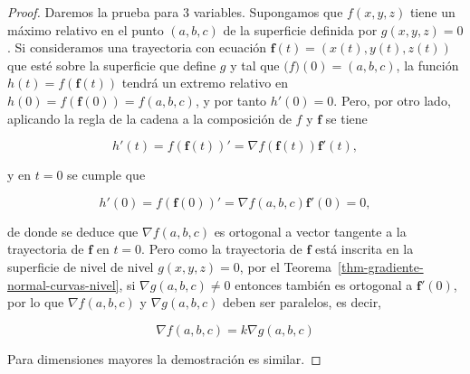 \documentclass[
  a4paper,
]{scrreport}
\theoremstyle{definition}
\theoremstyle{plain}
\theoremstyle{plain}
\theoremstyle{definition}
\theoremstyle{definition}
\theoremstyle{plain}
\theoremstyle{remark}
\begin{document}
\begin{tcolorbox}[enhanced jigsaw, breakable, title=\textcolor{quarto-callout-note-color}{\faInfo}\hspace{0.5em}{Demostración}, toprule=.15mm, coltitle=black, arc=.35mm, rightrule=.15mm, colframe=quarto-callout-note-color-frame, colbacktitle=quarto-callout-note-color!10!white, toptitle=1mm, titlerule=0mm, leftrule=.75mm, opacityback=0, colback=white, bottomrule=.15mm, bottomtitle=1mm, left=2mm, opacitybacktitle=0.6]

\begin{proof}

Daremos la prueba para 3 variables. Supongamos que \(f(x,y,z)\) tiene un
máximo relativo en el punto \((a,b,c)\) de la superficie definida por
\(g(x,y,z)=0\). Si consideramos una trayectoria con ecuación
\(\mathbf{f}(t)=(x(t),y(t),z(t))\) que esté sobre la superficie que
define \(g\) y tal que \(\mathbf(f)(0)=(a,b,c)\), la función
\(h(t)=f(\mathbf{f}(t))\) tendrá un extremo relativo en
\(h(0)=f(\mathbf{f}(0))=f(a,b,c)\), y por tanto \(h'(0)=0\). Pero, por
otro lado, aplicando la regla de la cadena a la composición de \(f\) y
\(\mathbf{f}\) se tiene

\[
h'(t) 
= f(\mathbf{f}(t))' 
= \nabla f(\mathbf{f}(t))\mathbf{f}'(t),
\]

y en \(t=0\) se cumple que

\[
h'(0) 
= f(\mathbf{f}(0))' 
= \nabla f(a,b,c)\mathbf{f}'(0) 
=0,
\]

de donde se deduce que \(\nabla f(a,b,c)\) es ortogonal a vector
tangente a la trayectoria de \(\mathbf{f}\) en \(t=0\). Pero como la
trayectoria de \(\mathbf{f}\) está inscrita en la superficie de nivel de
nivel \(g(x,y,z)=0\), por el
Teorema~\ref{thm-gradiente-normal-curvas-nivel}, si
\(\nabla g(a,b,c)\neq 0\) entonces también es ortogonal a
\(\mathbf{f}'(0)\), por lo que \(\nabla f(a,b,c)\) y \(\nabla g(a,b,c)\)
deben ser paralelos, es decir,

\[
\nabla f(a,b,c)
= k\nabla g(a,b,c)
\]

Para dimensiones mayores la demostración es similar.

\end{proof}

\end{tcolorbox}
\end{document}
